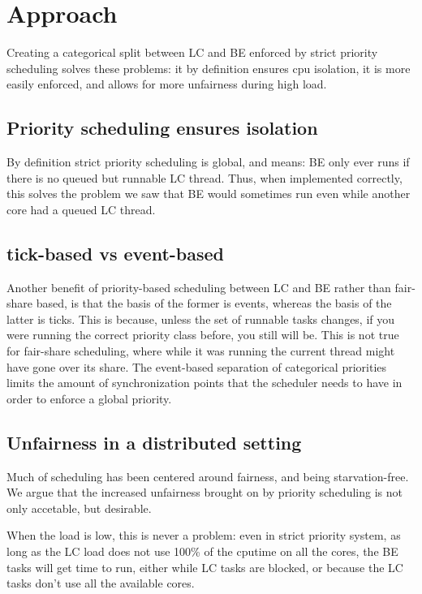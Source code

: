 \section{Approach}\label{s:approach}

Creating a categorical split between LC and BE enforced by strict priority
scheduling solves these problems: it by definition ensures cpu isolation, it is
more easily enforced, and allows for more unfairness during high load.

\subsection{Priority scheduling ensures isolation}

By definition strict priority scheduling is global, and means: BE only ever runs
if there is no queued but runnable LC thread. Thus, when implemented correctly,
this solves the problem we saw that BE would sometimes run even while another
core had a queued LC thread.

\subsection{tick-based vs event-based}

Another benefit of priority-based scheduling between LC and BE rather than
fair-share based, is that the basis of the former is events, whereas the basis
of the latter is ticks. This is because, unless the set of runnable tasks
changes, if you were running the correct priority class before, you still will
be. This is not true for fair-share scheduling, where while it was running the
current thread might have gone over its share. The event-based separation of
categorical priorities limits the amount of synchronization points that the
scheduler needs to have in order to enforce a global priority.

\subsection{Unfairness in a distributed setting}

Much of scheduling has been centered around fairness, and being starvation-free.
We argue that the increased unfairness brought on by priority scheduling is not
only accetable, but desirable.

When the load is low, this is never a problem: even in strict priority system,
as long as the LC load does not use 100\% of the cputime on all the cores, the
BE tasks will get time to run, either while LC tasks are blocked, or because the
LC tasks don't use all the available cores.

